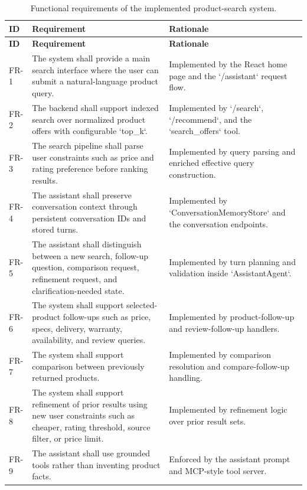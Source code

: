 \documentclass[12pt,a4paper,oneside]{report}
\begin{document}
\begingroup
\small
\setlength{\tabcolsep}{4pt}
\renewcommand{\arraystretch}{1.08}
\begin{longtable}{|C{0.08\textwidth}|L{0.31\textwidth}|L{0.43\textwidth}|}
\caption{Functional requirements of the implemented product-search system.}\label{tab:functional-reqs}\\
\hline
\textbf{ID} & \textbf{Requirement} & \textbf{Rationale} \\
\hline
\endfirsthead
\hline
\textbf{ID} & \textbf{Requirement} & \textbf{Rationale} \\
\hline
\endhead
FR-1 & The system shall provide a main search interface where the user can submit a natural-language product query. & Implemented by the React home page and the `/assistant` request flow. \\
\hline
FR-2 & The backend shall support indexed search over normalized product offers with configurable `top\_k`. & Implemented by `/search`, `/recommend`, and the `search\_offers` tool. \\
\hline
FR-3 & The search pipeline shall parse user constraints such as price and rating preference before ranking results. & Implemented by query parsing and enriched effective query construction. \\
\hline
FR-4 & The assistant shall preserve conversation context through persistent conversation IDs and stored turns. & Implemented by `ConversationMemoryStore` and the conversation endpoints. \\
\hline
FR-5 & The assistant shall distinguish between a new search, follow-up question, comparison request, refinement request, and clarification-needed state. & Implemented by turn planning and validation inside `AssistantAgent`. \\
\hline
FR-6 & The system shall support selected-product follow-ups such as price, specs, delivery, warranty, availability, and review queries. & Implemented by product-follow-up and review-follow-up handlers. \\
\hline
FR-7 & The system shall support comparison between previously returned products. & Implemented by comparison resolution and compare-follow-up handling. \\
\hline
FR-8 & The system shall support refinement of prior results using new user constraints such as cheaper, rating threshold, source filter, or price limit. & Implemented by refinement logic over prior result sets. \\
\hline
FR-9 & The assistant shall use grounded tools rather than inventing product facts. & Enforced by the assistant prompt and MCP-style tool server. \\

\end{longtable}
\end{document}
